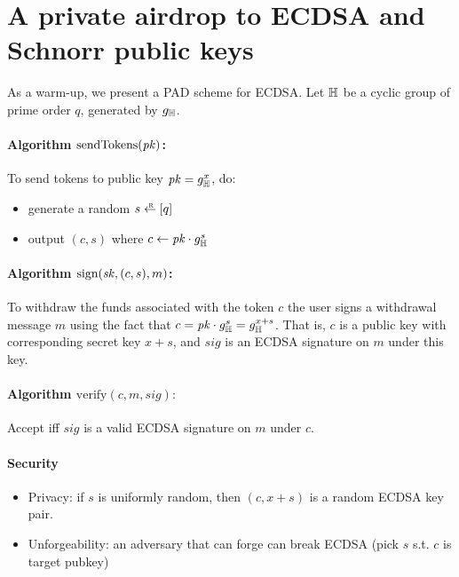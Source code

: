 \section{A private airdrop to ECDSA and Schnorr public keys}\label{sec:dsa}


As a warm-up, we present a PAD scheme for ECDSA.
%
Let $\mathbb H$ be a cyclic group of prime order $q$, generated by $g_\mathbb{H}$.


\paragraph{Algorithm $\text{sendTokens}(\mathit{pk})$:} To send tokens to public key $\mathit{pk} = g_\mathbb{H}^x$, do:
\begin{itemize}
\item generate a random $s \rgets \range{q}$
\item output $(c, s)$ where $c \gets \mathit{pk}\cdot g_\mathbb{H}^s$
\end{itemize}


\paragraph{Algorithm $\text{sign}(\mathit{sk}, (c, s), m)$:}
To withdraw the funds associated with the token $c$ the user signs a
    withdrawal message $m$ using the fact that
$c = \mathit{pk}\cdot g_\mathbb{H}^s = g_\mathbb{H}^{x+s}$.
%
That is, $c$ is a public key with corresponding secret key $x + s$, and
    $\mathit{sig}$ is an ECDSA signature on $m$ under this key.

\paragraph{Algorithm $\text{verify}(c, m, \mathit{sig}):$}
Accept iff $\mathit{sig}$ is a valid ECDSA signature on $m$ under $c$.


\paragraph{Security}
\begin{itemize}
\item Privacy: if $s$ is uniformly random, then $(c, x+s)$ is a random ECDSA key pair.

\item Unforgeability: an adversary that can forge can break ECDSA (pick $s$ s.t. $c$ is target pubkey)
\end{itemize}
